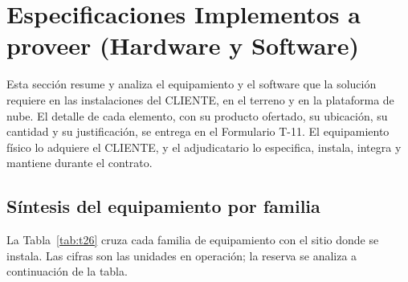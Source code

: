 %

\section{Especificaciones Implementos a proveer (Hardware y Software)}
\label{sec:implementos}

Esta sección resume y analiza el equipamiento y el software que la solución requiere en las instalaciones del CLIENTE, en el terreno y en la plataforma de nube. El detalle de cada elemento, con su producto ofertado, su ubicación, su cantidad y su justificación, se entrega en el Formulario T-11. El equipamiento físico lo adquiere el CLIENTE, y el adjudicatario lo especifica, instala, integra y mantiene durante el contrato.

\subsection{Síntesis del equipamiento por familia}

La Tabla~\ref{tab:t26} cruza cada familia de equipamiento con el sitio donde se instala. Las cifras son las unidades en operación; la reserva se analiza a continuación de la tabla.

